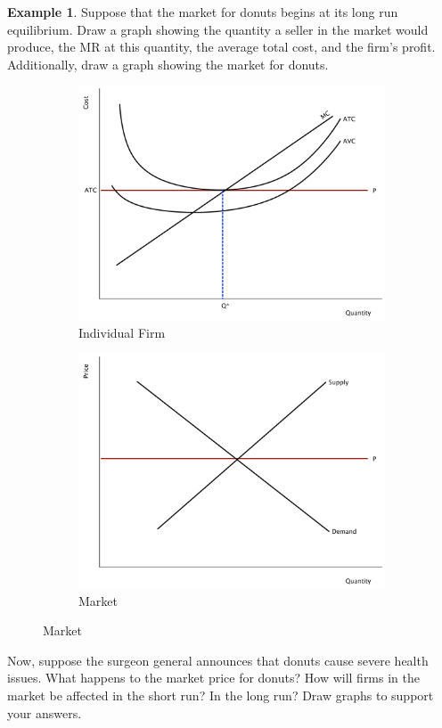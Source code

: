 \documentclass[11pt]{article}\usepackage[]{graphicx}\usepackage[]{color}
\theoremstyle{definition}
\newtheorem{exmp}{Example}[section]
\begin{document}
	
	\begin{exmp} Suppose that the market for donuts begins at its long run equilibrium. Draw a graph showing the quantity a seller in the market would produce, the MR at this quantity, the average total cost, and the firm's profit. Additionally, draw a graph showing the market for donuts. 
	
	
		\begin{figure}[H]
			\centering
			\caption{Perfectly Competitive Market in Long-run}
			\begin{subfigure}{.5\textwidth}
				\includegraphics[scale=.3]{plot68.pdf}
				\caption{Individual Firm}
			\end{subfigure}%
			\begin{subfigure}{.5\textwidth}
				\centering
				\includegraphics[scale=.3]{plot69.pdf}
				\caption{Market}
			\end{subfigure}
		\end{figure}
		
	
	Now, suppose the surgeon general announces that donuts cause severe health issues. What happens to the market price for donuts? How will firms in the market be affected in the short run? In the long run? Draw graphs to support your answers. 
\end{exmp}
\end{document}
